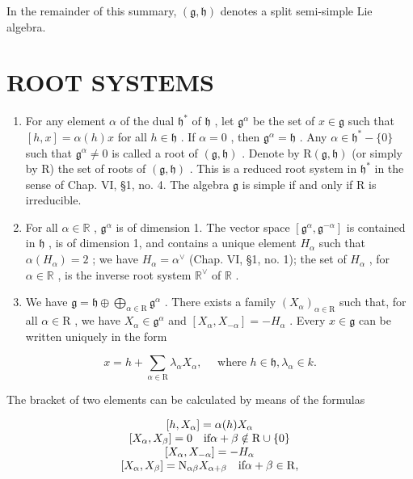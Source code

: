 In the remainder of this summary, \((\mathfrak{g},\mathfrak{h})\) denotes a split semi-simple Lie algebra.

\section*{ROOT SYSTEMS}

\begin{enumerate}
\def\labelenumi{\arabic{enumi})}
\setcounter{enumi}{4}
\item
  For any element \(\alpha\) of the dual \(\mathfrak{h}^*\) of \(\mathfrak{h}\) , let \(\mathfrak{g}^{\alpha}\) be the set of \(x\in \mathfrak{g}\) such that \([h,x] = \alpha (h)x\) for all \(h\in \mathfrak{h}\) . If \(\alpha = 0\) , then \(\mathfrak{g}^{\alpha} = \mathfrak{h}\) . Any \(\alpha \in \mathfrak{h}^{*} - \{0\}\) such that \(\mathfrak{g}^{\alpha}\neq 0\) is called a root of \((\mathfrak{g},\mathfrak{h})\) . Denote by \(\mathrm{R}(\mathfrak{g},\mathfrak{h})\) (or simply by R) the set of roots of \((\mathfrak{g},\mathfrak{h})\) . This is a reduced root system in \(\mathfrak{h}^*\) in the sense of Chap. VI, §1, no. 4. The algebra \(\mathfrak{g}\) is simple if and only if R is irreducible.
\item
  For all \(\alpha \in \mathbb{R}\) , \(\mathfrak{g}^{\alpha}\) is of dimension 1. The vector space \([\mathfrak{g}^{\alpha}, \mathfrak{g}^{-\alpha}]\) is contained in \(\mathfrak{h}\) , is of dimension 1, and contains a unique element \(H_{\alpha}\) such that \(\alpha(H_{\alpha}) = 2\) ; we have \(H_{\alpha} = \alpha^{\vee}\) (Chap. VI, §1, no. 1); the set of \(H_{\alpha}\) , for \(\alpha \in \mathbb{R}\) , is the inverse root system \(\mathbb{R}^{\vee}\) of \(\mathbb{R}\) .
\item
  We have \(\mathfrak{g} = \mathfrak{h} \oplus \bigoplus_{\alpha \in \mathrm{R}} \mathfrak{g}^{\alpha}\) . There exists a family \((X_{\alpha})_{\alpha \in \mathrm{R}}\) such that, for all \(\alpha \in \mathrm{R}\) , we have \(X_{\alpha} \in \mathfrak{g}^{\alpha}\) and \([X_{\alpha}, X_{-\alpha}] = -H_{\alpha}\) . Every \(x \in \mathfrak{g}\) can be written uniquely in the form
\end{enumerate}

\[
x = h + \sum_ {\alpha \in \mathrm{R}} \lambda_ {\alpha} X _ {\alpha}, \quad \text { where } h \in \mathfrak {h}, \lambda_ {\alpha} \in k.
\]

The bracket of two elements can be calculated by means of the formulas

\[
\begin{array}{c} [ h, X _ {\alpha} ] = \alpha (h) X _ {\alpha} \\ \relax [ X _ {\alpha}, X _ {\beta} ] = 0 \quad \text {if} \alpha + \beta \notin \mathrm{R} \cup \{0 \} \\ \relax [ X _ {\alpha}, X _ {- \alpha} ] = - H _ {\alpha} \\ \relax [ X _ {\alpha}, X _ {\beta} ] = \mathrm{N} _ {\alpha \beta} X _ {\alpha + \beta} \quad \text {if} \alpha + \beta \in \mathrm{R}, \end{array}
\]

